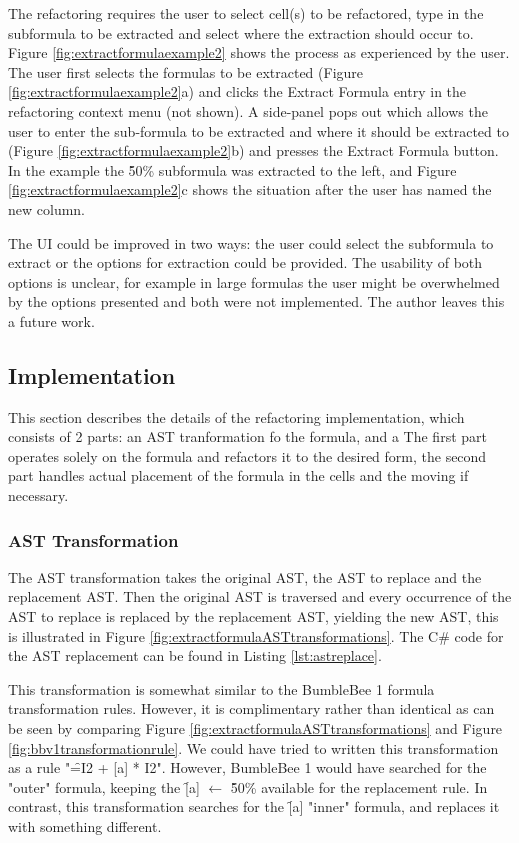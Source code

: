 The refactoring requires the user to select cell(s) to be refactored, type in the subformula to be extracted and select where the extraction should occur to.
Figure \ref{fig:extractformulaexample2} shows the process as experienced by the user.
The user first selects the formulas to be extracted (Figure \ref{fig:extractformulaexample2}a) and clicks the Extract Formula entry in the refactoring context menu (not shown).
A side-panel pops out which allows the user to enter the sub-formula to be extracted and where it should be extracted to (Figure \ref{fig:extractformulaexample2}b) and presses the Extract Formula button.
In the example the \f{50\%} subformula was extracted to the left, and Figure \ref{fig:extractformulaexample2}c shows the situation after the user has named the new column.

The UI could be improved in two ways: the user could select the subformula to extract or the options for extraction could be provided.
The usability of both options is unclear, for example in large formulas the user might be overwhelmed by the options presented and both were not implemented.
The author leaves this a future work.

\subsection{Implementation}

This section describes the details of the refactoring implementation, which consists of 2 parts: an AST tranformation fo the formula, and a 
The first part operates solely on the formula and refactors it to the desired form, the second part handles actual placement of the formula in the cells and the moving if necessary.

\subsubsection{AST Transformation}
\label{subsec:astreplacementtransformation}

The AST transformation takes the original AST, the AST to replace and the replacement AST.
Then the original AST is traversed and every occurrence of the AST to replace is replaced by the replacement AST, yielding the new AST, this is illustrated in Figure \ref{fig:extractformulaASTtransformations}.
The C\# code for the AST replacement can be found in Listing \ref{lst:astreplace}.

This transformation is somewhat similar to the BumbleBee 1 formula transformation rules.
However, it is complimentary rather than identical as can be seen by comparing Figure \ref{fig:extractformulaASTtransformations} and Figure \ref{fig:bbv1transformationrule}.
We could have tried to written this transformation as a rule "\f{=I2 + [a] * I2}".
However, BumbleBee 1 would have searched for the "outer" formula, keeping the \f{[a]} $\gets$ \f{50\%} available for the replacement rule.
In contrast, this transformation searches for the \f{[a]} "inner" formula, and replaces it with something different.

